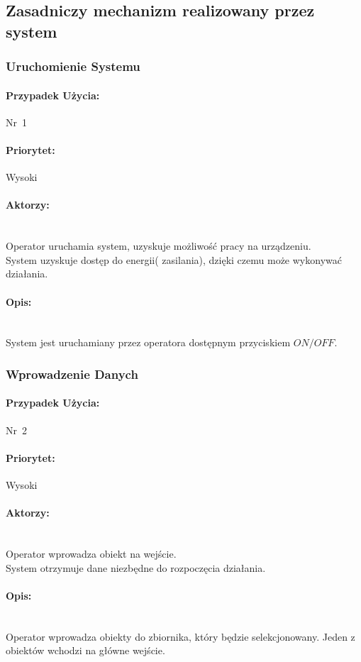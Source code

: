 \documentclass[12pt]{article}
\begin{document}
\subsection{Zasadniczy mechanizm realizowany przez system}
\subsubsection{Uruchomienie Systemu}
\paragraph{Przypadek Użycia:}\mbox{Nr 1}
\paragraph{Priorytet:}\mbox{Wysoki}	
\paragraph{Aktorzy:}\mbox{} \\
Operator uruchamia system, uzyskuje możliwość pracy na urządzeniu.\\
System uzyskuje dostęp do energii( zasilania), dzięki czemu może wykonywać działania.
\paragraph{Opis:}\mbox{} \\
System jest uruchamiany przez operatora dostępnym przyciskiem $ON/OFF.$

\subsubsection{Wprowadzenie Danych}
\paragraph{Przypadek Użycia:}\mbox{Nr 2}
\paragraph{Priorytet:}\mbox{Wysoki}	
\paragraph{Aktorzy:}\mbox{} \\
Operator wprowadza obiekt na wejście.\\
System otrzymuje dane niezbędne do rozpoczęcia działania.
\paragraph{Opis:}\mbox{} \\
Operator wprowadza obiekty do zbiornika, który będzie selekcjonowany. Jeden z obiektów wchodzi na główne wejście.
\end{document}
